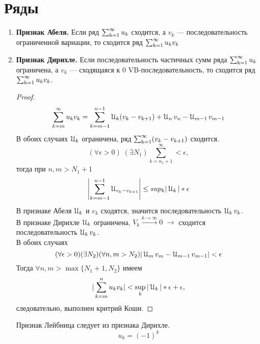\chapter{Ряды}
\begin{enumerate}
\item
\textbf{Признак Абеля.}
Если ряд $\operatorname{\sum_{k=1}^{\infty}} u_k$ сходится, а $v_k$ --- последовательность ограниченной вариации, то сходится ряд $\operatorname{\sum_{k=1}^{\infty}} u_k v_k$
\item
\textbf{Признак Дирихле.}
Если последовательность частичных сумм ряда $\operatorname{\sum_{k=1}^{\infty}} u_k$ ограничена,
а $v_k$ --- сходящаяся к 0 VB-последовательность, то сходится ряд $\operatorname{\sum_{k=1}^{\infty}} u_k v_k$.
\begin{proof}
$$ \sum_{k=m}^{\infty} u_k v_k = \sum_{k= m-1}^{n-1} \operatorname{\EuScript{U}}_k (v_k - v_{k+1}) + \operatorname{\EuScript{U}}_n v_n - \operatorname{\EuScript{U}}_{m-1}v_{m-1}$$
В обоих случаях $\operatorname{\EuScript{U}}_{k}$ ограничена, ряд $\operatorname{\sum_{k=1}^{\infty}} (v_k - v_{k+1})$ сходится.
$$(\forall \epsilon >0) \; (\exists N_1) \sum_{k=n_1 +1}^{\infty} < \epsilon,$$
тогда при $n,m > N_1 +1$
$$\left| \sum_{k=m-1}^{n-1} \operatorname{\EuScript{U}}_{v_k -v_{k+1}} \right| \le sup_{k} |\operatorname{\EuScript{U}}_k|*\epsilon$$
В признаке Абеля $\operatorname{\EuScript{U}}_k$ и $v_k$ сходятся, значится последовательность $\operatorname{\EuScript{U}}_k v_k$.\\
В признаке Дирихле $\operatorname{\EuScript{U}}_k$ ограничена, $V_k \xrightarrow{k\to\infty}0$
$\rightarrow$ сходится последовательность $\operatorname{\EuScript{U}}_k v_k$.\\
В обоих случаях
$$ (\forall \epsilon > 0) (\exists N_2) (\forall n,m > N_2) |\operatorname{\EuScript{U}}_m v_m - \operatorname{\EuScript{U}}_{m-1}v_{m-1}| < \epsilon$$
Тогда $\forall n,m > \max\{N_1 +1, N_2\}$ имеем
$$|\sum_{k=m}^{n} u_k v_k| < \sup_k |\operatorname{\EuScript{U}}_k|*\epsilon + \epsilon,$$
следовательно, выполнен критрий Коши.
\end{proof}
\begin{cor}
Признак Лейбница следует из признака Дирихле.
$$u_k = (-1)^k$$
\end{cor}
\end{enumerate}


